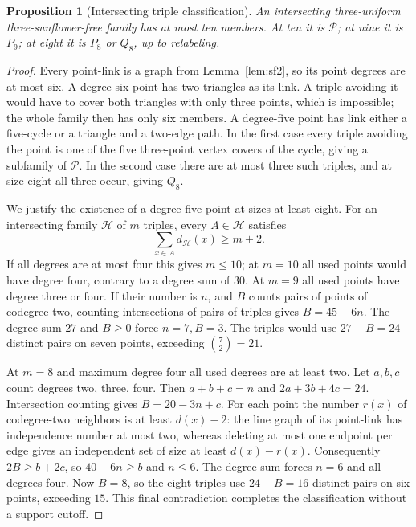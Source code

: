 \documentclass[11pt,a4paper]{article}
\numberwithin{equation}{section}
\newtheorem{proposition}[theorem]{Proposition}
\theoremstyle{remark}
\newcommand{\Pten}{\mathcal P}
\begin{document}
\begin{proposition}[Intersecting triple classification]
\label{prop:i810}
An intersecting three-uniform three-sunflower-free family has at most
ten members. At ten it is $\Pten $; at nine it is $ P_9$; at eight it is
$ P_8$ or $ Q_8$, up to relabeling.
\end{proposition}
\begin{proof}
Every point-link is a graph from Lemma~\ref{lem:sf2}, so its point
degrees are at most six. A degree-six point has two triangles as its
link. A triple avoiding it would have to cover both triangles with
only three points, which is impossible; the whole family then has
only six members. A degree-five point has link either a five-cycle
or a triangle and a two-edge path. In the first case every triple
avoiding the point is one of the five three-point vertex covers of
the cycle, giving a subfamily of $\Pten $. In the second case there
are at most three such triples, and at size eight all three occur,
giving $ Q_8$.

We justify the existence of a degree-five point at sizes at least
eight. For an intersecting family $\mathcal H $ of $ m $ triples,
every $ A\in\mathcal H $ satisfies
\[
 \sum_{x\in A}d_{\mathcal H}(x)\ge m+2.
\]
If all degrees are at most four this gives $ m\le 10$; at $ m=10$ all
used points would have degree four, contrary to a degree sum of $30$.
At $ m=9$ all used points have degree three or four. If their number
is $ n $, and $ B $ counts pairs of points of codegree two, counting
intersections of pairs of triples gives $ B=45-6n $. The degree sum
$27$ and $ B\ge 0$ force $ n=7,B=3$. The triples would use
$27-B=24$ distinct pairs on seven points, exceeding $\binom 72=21$.

At $ m=8$ and maximum degree four all used degrees are at least two.
Let $ a,b,c $ count degrees two, three, four. Then $ a+b+c=n $ and
$2a+3b+4c=24$. Intersection counting gives $ B=20-3n+c $.
For each point the number $ r(x)$ of codegree-two neighbors is at
least $ d(x)-2$: the line graph of its point-link has independence
number at most two, whereas deleting at most one endpoint per edge
gives an independent set of size at least $ d(x)-r(x)$. Consequently
$2B\ge b+2c $, so $40-6n\ge b $ and $ n\le 6$. The degree sum forces
$ n=6$ and all degrees four. Now $ B=8$, so the eight triples use
$24-B=16$ distinct pairs on six points, exceeding $15$. This final
contradiction completes the classification without a support cutoff.
\end{proof}
\end{document}
